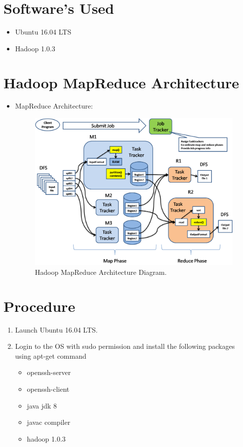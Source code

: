 \documentclass[a4paper,10pt]{article}
\begin{document}
\section{Software's Used}
\begin{itemize}
  \item Ubuntu  16.04 LTS
  \item Hadoop 1.0.3
\end{itemize}
\pagebreak

\section{Hadoop MapReduce Architecture}
\begin{itemize}
	\item MapReduce Architecture:
	\begin{figure}[h]
		\includegraphics[scale=0.30,center]{exptTwoScreenShot/MapRedArch.png}
		\caption{Hadoop MapReduce Architecture Diagram.}
		\label{fig:0}
	\end{figure}
\end{itemize}

\section{Procedure}

\begin{enumerate}
	\item Launch Ubuntu 16.04 LTS.
	\item Login to the OS with sudo permission and install the following packages using apt-get command
	\begin{itemize}
		\item openssh-server
		\item openssh-client
		\item java jdk 8
		\item javac compiler
        \item hadoop 1.0.3
	\end{itemize}
\pagebreak
\end{enumerate}
\end{document}
